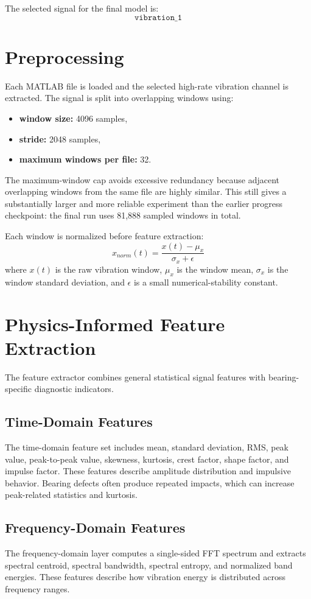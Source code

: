 \documentclass[11pt,a4paper]{article}
\begin{document}
The selected signal for the final model is:
\[
\texttt{vibration\_1}
\]

\section{Preprocessing}
Each MATLAB file is loaded and the selected high-rate vibration channel is extracted. The signal is split into overlapping windows using:

\begin{itemize}[leftmargin=2em]
    \item \textbf{window size:} 4096 samples,
    \item \textbf{stride:} 2048 samples,
    \item \textbf{maximum windows per file:} 32.
\end{itemize}

The maximum-window cap avoids excessive redundancy because adjacent overlapping windows from the same file are highly similar. This still gives a substantially larger and more reliable experiment than the earlier progress checkpoint: the final run uses 81,888 sampled windows in total.

Each window is normalized before feature extraction:
\[
x_{norm}(t)=\frac{x(t)-\mu_x}{\sigma_x+\epsilon}
\]
where \(x(t)\) is the raw vibration window, \(\mu_x\) is the window mean, \(\sigma_x\) is the window standard deviation, and \(\epsilon\) is a small numerical-stability constant.

\section{Physics-Informed Feature Extraction}
The feature extractor combines general statistical signal features with bearing-specific diagnostic indicators.

\subsection{Time-Domain Features}
The time-domain feature set includes mean, standard deviation, RMS, peak value, peak-to-peak value, skewness, kurtosis, crest factor, shape factor, and impulse factor. These features describe amplitude distribution and impulsive behavior. Bearing defects often produce repeated impacts, which can increase peak-related statistics and kurtosis.

\subsection{Frequency-Domain Features}
The frequency-domain layer computes a single-sided FFT spectrum and extracts spectral centroid, spectral bandwidth, spectral entropy, and normalized band energies. These features describe how vibration energy is distributed across frequency ranges.
\end{document}
